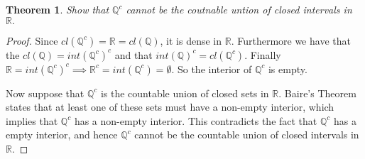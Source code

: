 \documentclass[letter]{article}
\newtheorem{theorem}{Theorem}
\newenvironment{menumerate}{%
  \edef\backupindent{\the\parindent}%
  \enumerate%
  \setlength{\parindent}{\backupindent}%
}{\endenumerate}
\begin{document}
\begin{menumerate}
	\setcounter{enumi}{19}
	\item
	\begin{theorem}
	Show that $\mathbb{Q}^c$ cannot be the coutnable untion of closed intervals in $\mathbb{R}.$
	\end{theorem}
	\begin{proof}
	Since $cl(\mathbb{Q}^c) = \mathbb{R} = cl(\mathbb{Q})$, it is dense in $\mathbb{R}.$ Furthermore we have that the $cl(\mathbb{Q}) = int(\mathbb{Q}^c)^c$ and that $int(\mathbb{Q})^c = cl(\mathbb{Q}^c)$. Finally $\mathbb{R} = int(\mathbb{Q}^c)^c \implies \mathbb{R}^c = int(\mathbb{Q}^c) = \emptyset.$ So the interior of $\mathbb{Q}^c$ is empty.

	Now suppose that $\mathbb{Q}^c$ is the countable union of closed sets in $\mathbb{R}.$ Baire's Theorem states that at least one of these sets must have a non-empty interior, which implies that $\mathbb{Q}^c$ has a non-empty interior. This contradicts the fact that $\mathbb{Q}^c$ has a empty interior, and hence $\mathbb{Q}^c$ cannot be the countable union of closed intervals in $\mathbb{R}.$
	\end{proof}

\end{menumerate}
\end{document}
